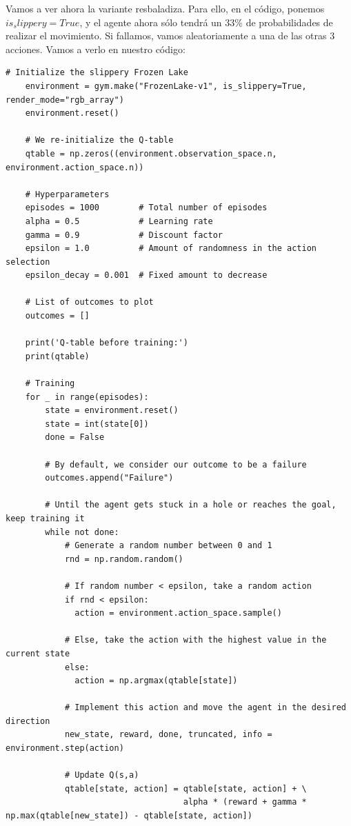 \documentclass{article}
\begin{document}
Vamos a ver ahora la variante resbaladiza. Para ello, en el código, ponemos $is_slippery = True$, y el agente ahora sólo tendrá un 33\% de probabilidades de realizar el movimiento. Si fallamos, vamos aleatoriamente a una de las otras 3 acciones. Vamos a verlo en nuestro código:

\vspace{0.5cm}

\begin{lstlisting}[style=mystyle]
    # Initialize the slippery Frozen Lake
    environment = gym.make("FrozenLake-v1", is_slippery=True, render_mode="rgb_array")
    environment.reset()
    
    # We re-initialize the Q-table
    qtable = np.zeros((environment.observation_space.n, environment.action_space.n))
    
    # Hyperparameters
    episodes = 1000        # Total number of episodes
    alpha = 0.5            # Learning rate
    gamma = 0.9            # Discount factor
    epsilon = 1.0          # Amount of randomness in the action selection
    epsilon_decay = 0.001  # Fixed amount to decrease
    
    # List of outcomes to plot
    outcomes = []
    
    print('Q-table before training:')
    print(qtable)
    
    # Training
    for _ in range(episodes):
        state = environment.reset()
        state = int(state[0])
        done = False
    
        # By default, we consider our outcome to be a failure
        outcomes.append("Failure")
        
        # Until the agent gets stuck in a hole or reaches the goal, keep training it
        while not done:
            # Generate a random number between 0 and 1
            rnd = np.random.random()
    
            # If random number < epsilon, take a random action
            if rnd < epsilon:
              action = environment.action_space.sample()
    
            # Else, take the action with the highest value in the current state
            else:
              action = np.argmax(qtable[state])
           
            # Implement this action and move the agent in the desired direction
            new_state, reward, done, truncated, info = environment.step(action)
    
            # Update Q(s,a)
            qtable[state, action] = qtable[state, action] + \
                                    alpha * (reward + gamma * np.max(qtable[new_state]) - qtable[state, action])
    

\end{lstlisting}
\end{document}
